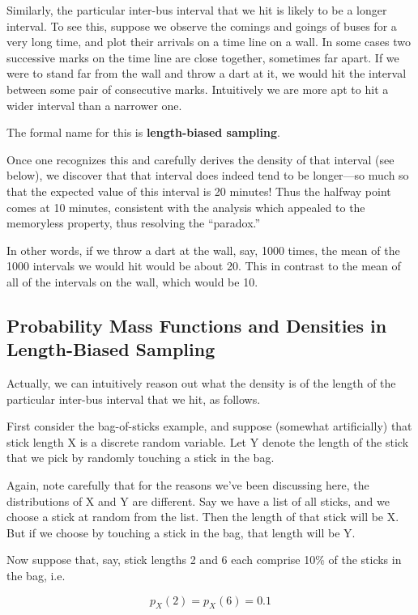 Similarly, the particular inter-bus interval that we hit is likely to be
a longer interval.  To see this, suppose we observe the comings and
goings of buses for a very long time, and plot their arrivals on a time
line on a wall.  In some cases two successive marks on the time line are
close together, sometimes far apart.  If we were to stand far from the
wall and throw a dart at it, we would hit the interval between some pair of
consecutive marks.  Intuitively we are more apt to hit a wider interval
than a narrower one.

The formal name for this is \textbf{length-biased sampling}.

Once one recognizes this and carefully derives the density of that
interval (see below), we discover that that interval does indeed tend to
be longer---so much so that the expected value of this interval is 20
minutes!  Thus the halfway point comes at 10 minutes, consistent with
the analysis which appealed to the memoryless property, thus resolving
the ``paradox.''

In other words, if we throw a dart at the wall, say, 1000
times, the mean of the 1000 intervals we would hit would be about 20.
This in contrast to the mean of all of the intervals on the wall, which
would be 10.

\subsection{Probability Mass Functions and Densities in Length-Biased
Sampling}

Actually, we can intuitively reason out what the density is of the
length of the particular inter-bus interval that we hit, as follows.

First consider the bag-of-sticks example, and suppose (somewhat
artificially) that stick length X is a discrete random variable.  Let Y
denote the length of the stick that we pick by randomly touching a stick
in the bag.  

Again, note carefully that for the reasons we've been discussing here,
the distributions of X and Y are different.  Say we have a list of all
sticks, and we choose a stick at random from the list.  Then the length
of that stick will be X.  But if we choose by touching a stick in the
bag, that length will be Y.

Now suppose that, say, stick lengths 2 and 6 each comprise 10\% of the
sticks in the bag, i.e.

\begin{equation}
p_X(2) = p_X(6) = 0.1
\end{equation}

